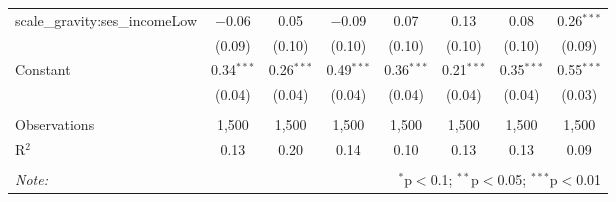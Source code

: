 \documentclass[
]{article}
\begin{document}
\begin{sidewaystable}[!htbp]
\begin{tabular}{@{\extracolsep{1pt}}lccccccc}
  scale\_gravity:ses\_incomeLow & $-$0.06 & 0.05 & $-$0.09 & 0.07 & 0.13 & 0.08 & 0.26$^{***}$ \\ 
  & (0.09) & (0.10) & (0.10) & (0.10) & (0.10) & (0.10) & (0.09) \\ 
  Constant & 0.34$^{***}$ & 0.26$^{***}$ & 0.49$^{***}$ & 0.36$^{***}$ & 0.21$^{***}$ & 0.35$^{***}$ & 0.55$^{***}$ \\ 
  & (0.04) & (0.04) & (0.04) & (0.04) & (0.04) & (0.04) & (0.03) \\ 
 \hline \\[-1.8ex] 
Observations & 1,500 & 1,500 & 1,500 & 1,500 & 1,500 & 1,500 & 1,500 \\ 
R$^{2}$ & 0.13 & 0.20 & 0.14 & 0.10 & 0.13 & 0.13 & 0.09 \\ 
\hline 
\hline \\[-1.8ex] 
\textit{Note:}  & \multicolumn{7}{r}{$^{*}$p$<$0.1; $^{**}$p$<$0.05; $^{***}$p$<$0.01} \\ 
\end{tabular} 
\end{sidewaystable}
\end{document}
